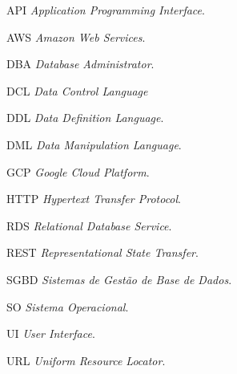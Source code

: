 \begin{siglas}
  \item[API] \textit{Application Programming Interface}.
  \item[AWS] \textit{Amazon Web Services}.
  \item[DBA] \textit{Database Administrator}.
  \item[DCL] \textit{Data Control Language}
  \item[DDL] \textit{Data Definition Language}.
  \item[DML] \textit{Data Manipulation Language}.
  \item[GCP] \textit{Google Cloud Platform}.
  \item[HTTP] \textit{Hypertext Transfer Protocol}.
  \item[RDS] \textit{Relational Database Service}.
  \item[REST] \textit{Representational State Transfer}.
  \item[SGBD] \textit{Sistemas de Gestão de Base de Dados}.
  \item[SO] \textit{Sistema Operacional}.
  \item[UI] \textit{User Interface}.
  \item[URL] \textit{Uniform Resource Locator}.
\end{siglas}